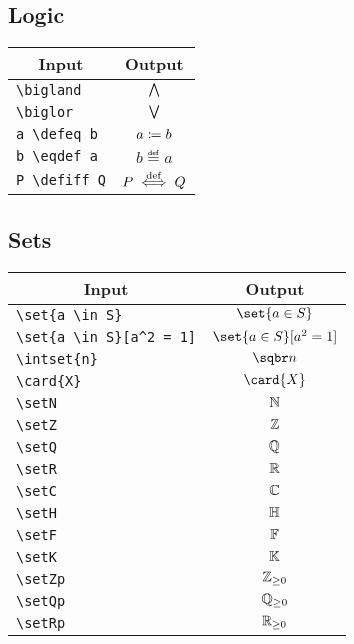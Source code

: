 \documentclass[a4paper, 11pt]{article}
\begin{document}
\subsection{Logic}
\begin{center}
  \begin{tabular}{lc} \toprule
    \multicolumn{1}{c}{Input} & Output        \\\midrule
    \verb|\bigland|   & $\bigwedge$    \\
    \verb|\biglor|   & $\bigvee$     \\
    \verb|a \defeq b|   & $a \coloneqq b$  \\
    \verb|b \eqdef a|   & $b \eqdef a$  \\
    \verb|P \defiff Q|   & $P \overset{\mathrm{def}}{\iff} Q$ \\
    \bottomrule
  \end{tabular}
\end{center}

\subsection{Sets}
\begin{center}
  \begin{tabular}{lc} \toprule
    \multicolumn{1}{c}{Input} & Output                   \\\midrule
    \verb|\set{a \in S}|   & $\set{a \in S}$          \\
    \verb|\set{a \in S}[a^2 = 1]|   & $\set{a \in S}[a^2 = 1]$ \\
    \verb|\intset{n}|   & $\intset{n}$             \\
    \verb|\card{X}|   & $\card{X}$               \\
    \verb|\setN|   & $\mathbb{N}$                  \\
    \verb|\setZ|   & $\mathbb{Z}$                  \\
    \verb|\setQ|   & $\mathbb{Q}$                  \\
    \verb|\setR|   & $\mathbb{R}$                  \\
    \verb|\setC|   & $\mathbb{C}$                  \\
    \verb|\setH|   & $\mathbb{H}$                  \\
    \verb|\setF|   & $\mathbb{F}$                  \\
    \verb|\setK|   & $\mathbb{K}$                  \\
    \verb|\setZp|   & $\mathbb{Z}_{\geq 0}$                 \\
    \verb|\setQp|   & $\mathbb{Q}_{\geq 0}$                 \\
    \verb|\setRp|   & $\mathbb{R}_{\geq 0}$                 \\
    \bottomrule
  \end{tabular}
\end{center}
\end{document}
